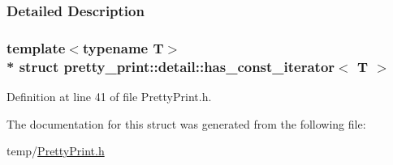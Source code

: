 \subsubsection{Detailed Description}
\subsubsection*{template$<$typename T$>$\\*
struct pretty\+\_\+print\+::detail\+::has\+\_\+const\+\_\+iterator$<$ T $>$}



Definition at line 41 of file Pretty\+Print.\+h.



The documentation for this struct was generated from the following file\+:\begin{DoxyCompactItemize}
\item 
temp/\hyperlink{PrettyPrint_8h}{Pretty\+Print.\+h}\end{DoxyCompactItemize}
